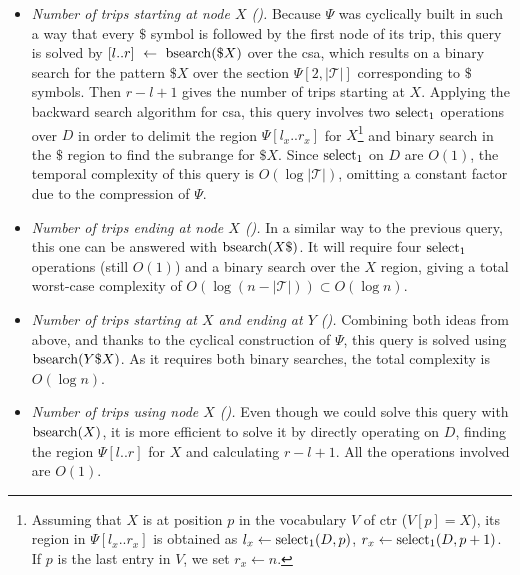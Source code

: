 	\begin{itemize}
	\item {\em Number of trips starting at node $X$ (\startX).}
	Because $\Psi$ was cyclically built in such a way that every $\$$ symbol is followed by the first node 
	of its trip, this query is solved by $[l..r]~\leftarrow~\operatorname{bsearch}(\$X)$ over the \gls{csa}, 
	which results on a binary search for the pattern $\$X$ over the section $\Psi[2,|\mathcal{T}|]$ corresponding to $\$$ symbols. 
	Then $r-l+1$ gives the number of trips starting at $X$.
	Applying the backward search algorithm for \gls{csa}, this query involves two $\operatorname{select}_1$ operations over $D$ in order to delimit the region $\Psi[l_x..r_x]$ for $X$\footnote{Assuming that $X$ is at position $p$ in the vocabulary $V$ of \gls{ctr} ($V[p]=X$), its region in $\Psi[l_x..r_x]$ is obtained as $l_x \leftarrow \operatorname{select}_1(D,p)$,  $r_x \leftarrow \operatorname{select}_1(D,p+1)$. If $p$ is the last entry in $V$, we set $r_x \leftarrow n$.} and binary search in the $\$$ region to find the subrange for $\$X$. Since $\operatorname{select}_1$ on $D$ are $O(1)$, the temporal complexity of this query is $O(\log|\mathcal{T}|)$, omitting a constant factor due to the compression of $\Psi$.

	\item {\em Number of trips ending at node $X$ (\endX).} In a similar way to the previous query, this one can be answered with $\operatorname{bsearch}(X\$)$. It will require four $\operatorname{select}_1$ operations (still $O(1)$) and a binary search over the $X$ region, giving a total worst-case complexity of $O(\log (n - |\mathcal{T}|)) \subset O(\log n)$.

	\item {\em Number of trips starting at $X$ and ending at $Y$ (\XtoY).}
	Combining both ideas from above, and thanks to the cyclical construction of $\Psi$, this query is solved using $\operatorname{bsearch}(Y\$X)$. As it requires both binary searches, the total complexity is $O(\log n)$.

	\item {\em Number of trips using node $X$ (\loadX).}
	Even though we could solve this query with $\operatorname{bsearch}(X)$, it is more efficient to solve it by directly operating on $D$, finding the region $\Psi[l..r]$ for $X$ and calculating $r-l+1$. All the operations involved are $O(1)$.


\end{itemize}

